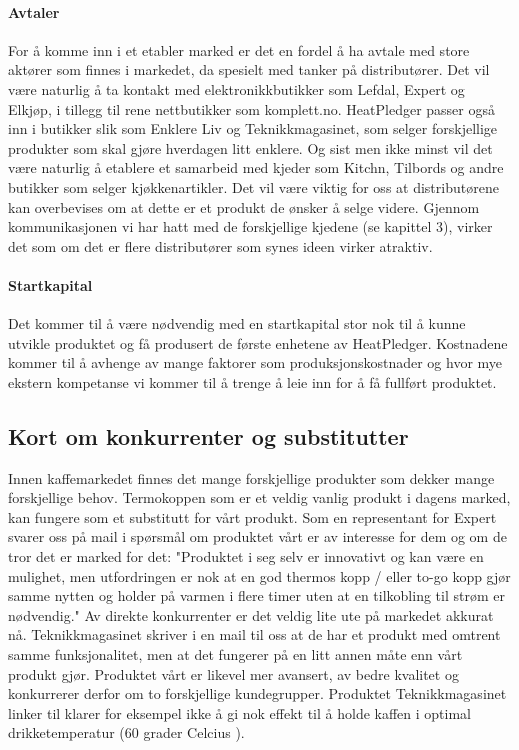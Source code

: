 \paragraph{Avtaler}
For å komme inn i et etabler marked er det en fordel å ha avtale med store aktører som finnes i markedet, da spesielt med tanker på distributører. Det vil være naturlig å ta kontakt med elektronikkbutikker som Lefdal, Expert og Elkjøp, i tillegg til rene nettbutikker som komplett.no. HeatPledger passer også inn i butikker slik som Enklere Liv og Teknikkmagasinet, som selger forskjellige produkter som skal gjøre hverdagen litt enklere. Og sist men ikke minst vil det være naturlig å etablere et samarbeid med kjeder som Kitchn, Tilbords og andre butikker som selger kjøkkenartikler. Det vil være viktig for oss at distributørene kan overbevises om at dette er et produkt de ønsker å selge videre. Gjennom kommunikasjonen vi har hatt med de forskjellige kjedene (se kapittel 3), virker det som om det er flere distributører som synes ideen virker atraktiv.

\paragraph{Startkapital}
Det kommer til å være nødvendig med en startkapital stor nok til å kunne utvikle produktet og få produsert de første enhetene av HeatPledger. Kostnadene kommer til å avhenge av mange faktorer som produksjonskostnader og hvor mye ekstern kompetanse vi kommer til å trenge å leie inn for å få fullført produktet. 

\subsection{Kort om konkurrenter og substitutter}
Innen kaffemarkedet finnes det mange forskjellige produkter som dekker mange forskjellige behov. Termokoppen som er et veldig vanlig produkt i dagens marked, kan fungere som et substitutt for vårt produkt. Som en representant for Expert svarer oss på mail i spørsmål om produktet vårt er av interesse for dem og om de tror det er marked for det: "Produktet i seg selv er innovativt og kan være en mulighet, men utfordringen er nok at en god thermos kopp / eller to-go kopp gjør samme nytten og holder på varmen i flere timer uten at en tilkobling til strøm er nødvendig." Av direkte konkurrenter er det veldig lite ute på markedet akkurat nå. Teknikkmagasinet skriver i en mail til oss at de har et produkt med omtrent samme funksjonalitet, men at det fungerer på en litt annen måte enn vårt produkt gjør. Produktet vårt er likevel mer avansert, av bedre kvalitet og konkurrerer derfor om to forskjellige kundegrupper. Produktet Teknikkmagasinet linker til \cite{tmprod} klarer for eksempel ikke å gi nok effekt til å holde kaffen i optimal drikketemperatur (60 grader Celcius \cite{optimaldrikketemperatur}).

